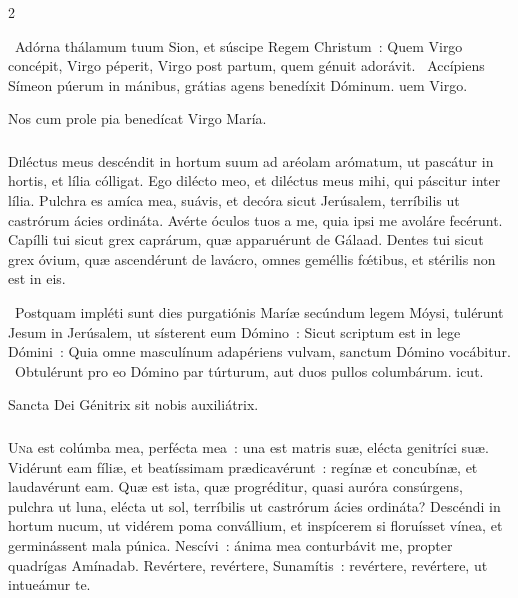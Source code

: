 \documentclass[9pt,twoside]{extarticle}
\begin{document}
\begin{multicols}{2}
\begin{tightlist}{}
\item {}~Adórna thálamum tuum Sion, et súscipe Regem Christum~: \textred{*} Quem Virgo concépit, Virgo péperit, Virgo post partum, quem génuit adorávit. ~Accípiens Símeon púerum in mánibus, grátias agens benedíxit Dóminum. uem Virgo.
\item {\small {} Nos cum prole pia benedícat Virgo María.}
\end{tightlist}

\subsubsection*{\center{}}
\lettrine{D}iléctus meus descéndit in hortum suum ad aréolam arómatum, ut pascátur in hortis, et lília cólligat. Ego dilécto meo, et diléctus meus mihi, qui páscitur inter lília. Pulchra es amíca mea, suávis, et decóra sicut Jerúsalem, terríbilis ut castrórum ácies ordináta. Avérte óculos tuos a me, quia ipsi me avoláre fecérunt. Capílli tui sicut grex caprárum, quæ apparuérunt de Gálaad. Dentes tui sicut grex óvium, quæ ascendérunt de lavácro, omnes geméllis fœ́tibus, et stérilis non est in eis.

\begin{tightlist}{}
\item {}~Postquam impléti sunt dies purgatiónis Maríæ secúndum legem Móysi, tulérunt Jesum in Jerúsalem, ut sísterent eum Dómino~: \textred{*} Sicut scriptum est in lege Dómini~: Quia omne masculínum adapériens vulvam, sanctum Dómino vocábitur. ~Obtulérunt pro eo Dómino par túrturum, aut duos pullos columbárum. icut.
\item {\small {} Sancta Dei Génitrix sit nobis auxiliátrix.}
\end{tightlist}

\subsubsection*{\center{}}
\lettrine{U}na est colúmba mea, perfécta mea~: una est matris suæ, elécta genitríci suæ. Vidérunt eam fíliæ, et beatíssimam prædicavérunt~: regínæ et concubínæ, et laudavérunt eam. Quæ est ista, quæ progréditur, quasi auróra consúrgens, pulchra ut luna, elécta ut sol, terríbilis ut castrórum ácies ordináta? Descéndi in hortum nucum, ut vidérem poma convállium, et inspícerem si floruísset vínea, et germinássent mala púnica. Nescívi~: ánima mea conturbávit me, propter quadrígas Amínadab. Revértere, revértere, Sunamítis~: revértere, revértere, ut intueámur te.


\end{multicols}
\end{document}
